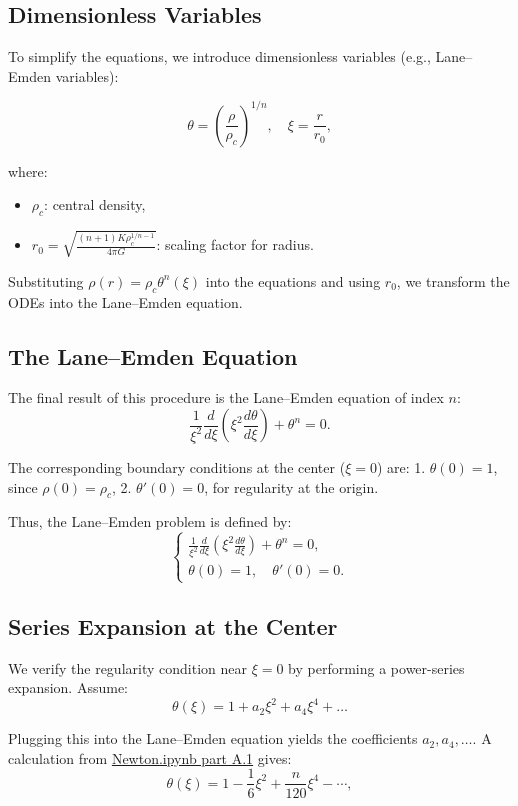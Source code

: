 \documentclass[12pt]{article}
\begin{document}
\subsection{Dimensionless Variables}

To simplify the equations, we introduce dimensionless variables (e.g., Lane–Emden variables):

\[
\theta = \left(\frac{\rho}{\rho_c}\right)^{1/n}, \quad \xi = \frac{r}{r_0},
\]

where:
\begin{itemize}
    \item \(\rho_c\): central density,
    \item \(r_0 = \sqrt{\frac{(n+1)K\rho_c^{1/n - 1}}{4\pi G}}\): scaling factor for radius.
\end{itemize}

Substituting \(\rho(r) = \rho_c \theta^n(\xi)\) into the equations and using \(r_0\), we transform the ODEs into the Lane–Emden equation.

\subsection{The Lane–Emden Equation}

The final result of this procedure is the Lane–Emden equation of index \(n\):
\[
\boxed{
\frac{1}{\xi^2} \frac{d}{d\xi} \left( \xi^2 \frac{d\theta}{d\xi} \right) + \theta^n = 0.
}
\]

The corresponding boundary conditions at the center (\(\xi=0\)) are:
1. \(\theta(0) = 1\), since \(\rho(0) = \rho_c\),
2. \(\theta'(0) = 0\), for regularity at the origin.

Thus, the Lane–Emden problem is defined by:
\[
\begin{cases}
\frac{1}{\xi^2} \frac{d}{d\xi} \left( \xi^2 \frac{d\theta}{d\xi} \right) + \theta^n = 0, \\[6pt]
\theta(0) = 1, \quad \theta'(0) = 0.
\end{cases}
\]

\subsection{Series Expansion at the Center}

We verify the regularity condition near \(\xi=0\) by performing a power-series expansion. Assume:
\[
\theta(\xi) 
= 1 + a_2 \xi^2 + a_4 \xi^4 + \dots
\]

Plugging this into the Lane–Emden equation yields the coefficients \(a_2, a_4, \dots\). A calculation from \href{Newton.ipynb}{Newton.ipynb part A.1} gives:
\[
\theta(\xi)
= 1 - \frac{1}{6}\xi^2 + \frac{n}{120}\xi^4 - \cdots,
\]
\end{document}
